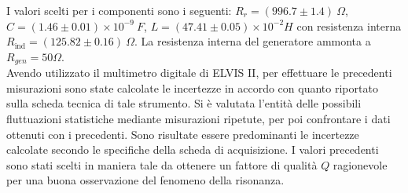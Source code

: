 I valori scelti per i componenti sono i seguenti: $R_r = (996.7 \pm 1.4) \ \Omega$, $C = (1.46 \pm 0.01) \times 10^{-9} \ F$,
$L = (47.41 \pm 0.05) \times 10^{-2} H$ con resistenza interna $R_{\text{ind}} = (125.82 \pm 0.16) \ \Omega$. La resistenza interna
del generatore ammonta a $R_{gen} = 50 \Omega$. \\
Avendo utilizzato il multimetro digitale di ELVIS II, per effettuare le precedenti misurazioni sono state calcolate le
incertezze in accordo con quanto riportato sulla scheda tecnica di tale strumento. Si è valutata l'entità delle possibili
fluttuazioni statistiche mediante misurazioni ripetute, per poi confrontare i dati ottenuti con i precedenti.
Sono risultate essere predominanti le incertezze calcolate secondo le specifiche della scheda di acquisizione.
I valori precedenti sono stati scelti in maniera tale da ottenere
un fattore di qualità $Q$ ragionevole per una buona osservazione del fenomeno della risonanza.


